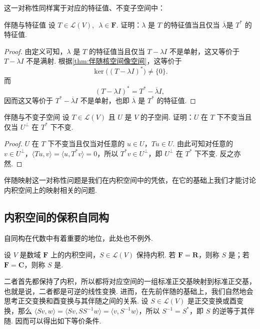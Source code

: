 这一对称性同样寓于对应的特征值、不变子空间中：

\begin{example}{}{伴随与特征值}
    设 $ T \in \mathcal{L}(V),\enspace \lambda \in \mathbf{F} $. 证明：$ \lambda $ 是 $ T $ 的特征值当且仅当 $ \overline{\lambda} $是 $ T^* $ 的特征值.
\end{example}

\begin{proof}
    由定义可知，$ \lambda $ 是 $ T $ 的特征值当且仅当 $ T - \lambda I $ 不是单射，这又等价于 $ T - \lambda I $ 不是满射. 根据\autoref{thm:伴随核空间像空间}，这等价于
    \[
        \ker \bigl( (T - \lambda I)^* \bigr) \neq \{ 0 \}.
    \]
    而
    \[
        (T - \lambda I)^* = T^* - \overline{\lambda} I,
    \]
    因而这又等价于 $ T^* - \overline{\lambda} I $ 不是单射，也即 $ \overline{\lambda} $ 是 $ T^* $ 的特征值.
\end{proof}

\begin{example}{}{伴随与不变子空间}
    设 $ T \in \mathcal{L}(V) $ 且 $ U $ 是 $ V $ 的子空间. 证明：$ U $ 在 $ T $ 下不变当且仅当 $ U^{\perp} $ 在 $ T^* $ 下不变.
\end{example}

\begin{proof}
$U$ 在 $T$ 下不变当且仅当对任意的 $u\in U$，$Tu \in U$. 由此可知对任意的 $v\in U^{\perp}$，$\langle Tu, v \rangle = \langle u, T^*v \rangle = 0$，所以 $T^*v \in U^{\perp}$，即 $U^{\perp}$ 在 $T^*$ 下不变. 反之亦然.
\end{proof}

伴随映射这一对称性问题是我们在内积空间中的凭依，在它的基础上我们才能讨论内积空间上的映射相关的问题.

\subsection{内积空间的保积自同构}

自同构在代数中有着重要的地位，此处也不例外.

\begin{definition}{}{}
    设 $ V $ 是数域 $ \mathbf{F} $ 上的内积空间，$ S \in \mathcal{L}(V) $ 保持内积. 若 $ \mathbf{F} = \mathbf{R} $，则称 $ S $ 是；若 $ \mathbf{F} = \mathbf{C} $，则称 $ S $ 是.
\end{definition}

二者首先都保持了内积，所以都将对应空间的一组标准正交基映射到标准正交基，也就是说，二者都是可逆的线性变换. 进而，在先前伴随的基础上，我们自然地会思考正交变换和酉变换与其伴随之间的关系. 设 $ S \in \mathcal{L}(V) $ 是正交变换或酉变换，那么 $ \langle Sv, w \rangle = \langle Sv, SS^{-1} w \rangle = \langle v, S^{-1}w \rangle $，所以 $ S^{-1} = S^* $，即 $ S $ 的逆等于其伴随. 因而可以得出如下等价条件.

